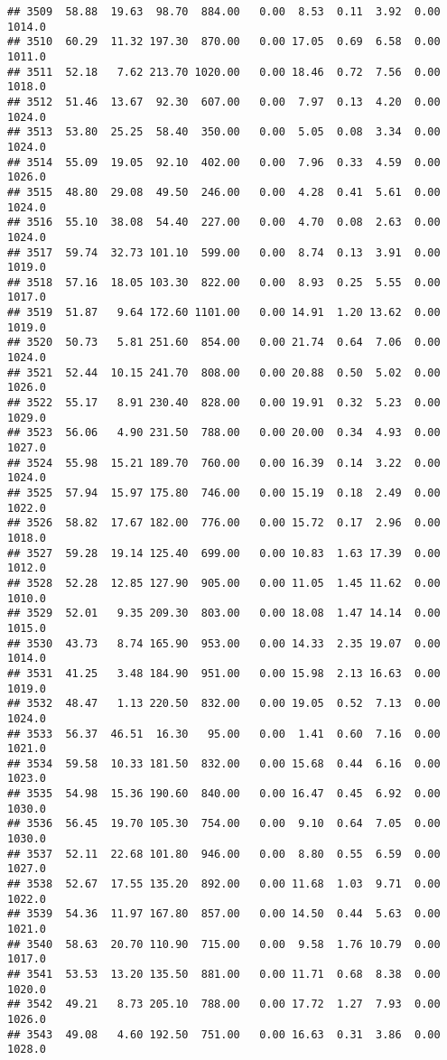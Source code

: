 \documentclass{article}\usepackage{graphicx, color}
\makeatletter
\newenvironment{kframe}{%
 \def\at@end@of@kframe{}%
 \ifinner\ifhmode%
  \def\at@end@of@kframe{\end{minipage}}%
  \begin{minipage}{\columnwidth}%
 \fi\fi%
 \def\FrameCommand##1{\hskip\@totalleftmargin \hskip-\fboxsep
 \colorbox{shadecolor}{##1}\hskip-\fboxsep
     \hskip-\linewidth \hskip-\@totalleftmargin \hskip\columnwidth}%
 \MakeFramed {\advance\hsize-\width
   \@totalleftmargin\z@ \linewidth\hsize
   \@setminipage}}%
 {\par\unskip\endMakeFramed%
 \at@end@of@kframe}
\newenvironment{knitrout}{}{} %
\makeatother
\begin{document}
\begin{knitrout}
\begin{kframe}
\begin{verbatim}
## 3509  58.88  19.63  98.70  884.00   0.00  8.53  0.11  3.92  0.00 1014.0
## 3510  60.29  11.32 197.30  870.00   0.00 17.05  0.69  6.58  0.00 1011.0
## 3511  52.18   7.62 213.70 1020.00   0.00 18.46  0.72  7.56  0.00 1018.0
## 3512  51.46  13.67  92.30  607.00   0.00  7.97  0.13  4.20  0.00 1024.0
## 3513  53.80  25.25  58.40  350.00   0.00  5.05  0.08  3.34  0.00 1024.0
## 3514  55.09  19.05  92.10  402.00   0.00  7.96  0.33  4.59  0.00 1026.0
## 3515  48.80  29.08  49.50  246.00   0.00  4.28  0.41  5.61  0.00 1024.0
## 3516  55.10  38.08  54.40  227.00   0.00  4.70  0.08  2.63  0.00 1024.0
## 3517  59.74  32.73 101.10  599.00   0.00  8.74  0.13  3.91  0.00 1019.0
## 3518  57.16  18.05 103.30  822.00   0.00  8.93  0.25  5.55  0.00 1017.0
## 3519  51.87   9.64 172.60 1101.00   0.00 14.91  1.20 13.62  0.00 1019.0
## 3520  50.73   5.81 251.60  854.00   0.00 21.74  0.64  7.06  0.00 1024.0
## 3521  52.44  10.15 241.70  808.00   0.00 20.88  0.50  5.02  0.00 1026.0
## 3522  55.17   8.91 230.40  828.00   0.00 19.91  0.32  5.23  0.00 1029.0
## 3523  56.06   4.90 231.50  788.00   0.00 20.00  0.34  4.93  0.00 1027.0
## 3524  55.98  15.21 189.70  760.00   0.00 16.39  0.14  3.22  0.00 1024.0
## 3525  57.94  15.97 175.80  746.00   0.00 15.19  0.18  2.49  0.00 1022.0
## 3526  58.82  17.67 182.00  776.00   0.00 15.72  0.17  2.96  0.00 1018.0
## 3527  59.28  19.14 125.40  699.00   0.00 10.83  1.63 17.39  0.00 1012.0
## 3528  52.28  12.85 127.90  905.00   0.00 11.05  1.45 11.62  0.00 1010.0
## 3529  52.01   9.35 209.30  803.00   0.00 18.08  1.47 14.14  0.00 1015.0
## 3530  43.73   8.74 165.90  953.00   0.00 14.33  2.35 19.07  0.00 1014.0
## 3531  41.25   3.48 184.90  951.00   0.00 15.98  2.13 16.63  0.00 1019.0
## 3532  48.47   1.13 220.50  832.00   0.00 19.05  0.52  7.13  0.00 1024.0
## 3533  56.37  46.51  16.30   95.00   0.00  1.41  0.60  7.16  0.00 1021.0
## 3534  59.58  10.33 181.50  832.00   0.00 15.68  0.44  6.16  0.00 1023.0
## 3535  54.98  15.36 190.60  840.00   0.00 16.47  0.45  6.92  0.00 1030.0
## 3536  56.45  19.70 105.30  754.00   0.00  9.10  0.64  7.05  0.00 1030.0
## 3537  52.11  22.68 101.80  946.00   0.00  8.80  0.55  6.59  0.00 1027.0
## 3538  52.67  17.55 135.20  892.00   0.00 11.68  1.03  9.71  0.00 1022.0
## 3539  54.36  11.97 167.80  857.00   0.00 14.50  0.44  5.63  0.00 1021.0
## 3540  58.63  20.70 110.90  715.00   0.00  9.58  1.76 10.79  0.00 1017.0
## 3541  53.53  13.20 135.50  881.00   0.00 11.71  0.68  8.38  0.00 1020.0
## 3542  49.21   8.73 205.10  788.00   0.00 17.72  1.27  7.93  0.00 1026.0
## 3543  49.08   4.60 192.50  751.00   0.00 16.63  0.31  3.86  0.00 1028.0

\end{verbatim}
\end{kframe}
\end{knitrout}
\end{document}
